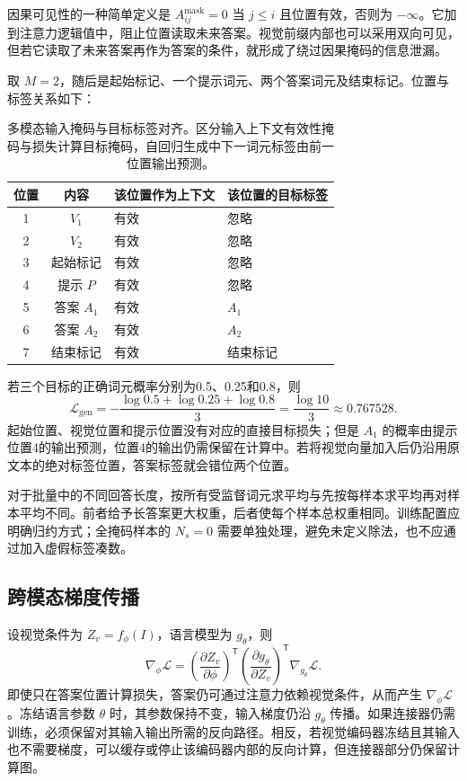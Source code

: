 \documentclass[../textbook.tex]{subfiles}
\begin{document}
因果可见性的一种简单定义是 $A_{ij}^{\mathrm{mask}}=0$ 当 $j\le i$ 且位置有效，否则为 $-\infty$。它加到注意力逻辑值中，阻止位置读取未来答案。视觉前缀内部也可以采用双向可见，但若它读取了未来答案再作为答案的条件，就形成了绕过因果掩码的信息泄漏。

\begin{example}

取 $M=2$，随后是起始标记、一个提示词元、两个答案词元及结束标记。位置与标签关系如下：
\begin{table}[htbp]
\centering
\caption[多模态输入掩码与目标标签对齐]{多模态输入掩码与目标标签对齐。区分输入上下文有效性掩码与损失计算目标掩码，自回归生成中下一词元标签由前一位置输出预测。}\label{tab:mm-labels}
\begin{tabular}{ccll}
\toprule 位置 & 内容 & 该位置作为上下文 & 该位置的目标标签\\\midrule
1 & $V_1$ & 有效 & 忽略\\
2 & $V_2$ & 有效 & 忽略\\
3 & 起始标记 & 有效 & 忽略\\
4 & 提示 $P$ & 有效 & 忽略\\
5 & 答案 $A_1$ & 有效 & $A_1$\\
6 & 答案 $A_2$ & 有效 & $A_2$\\
7 & 结束标记 & 有效 & 结束标记\\\bottomrule
\end{tabular}
\end{table}
若三个目标的正确词元概率分别为0.5、0.25和0.8，则
\begin{equation*}
 \mathcal L_{\mathrm{gen}}
 =-\frac{\log0.5+\log0.25+\log0.8}{3}
 =\frac{\log10}{3}\approx0.767528.
\end{equation*}
起始位置、视觉位置和提示位置没有对应的直接目标损失；但是 $A_1$ 的概率由提示位置4的输出预测，位置4的输出仍需保留在计算中。若将视觉向量加入后仍沿用原文本的绝对标签位置，答案标签就会错位两个位置。

对于批量中的不同回答长度，按所有受监督词元求平均与先按每样本求平均再对样本平均不同。前者给予长答案更大权重，后者使每个样本总权重相同。训练配置应明确归约方式；全掩码样本的 $N_s=0$ 需要单独处理，避免未定义除法，也不应通过加入虚假标签凑数。
\end{example}

\subsection{跨模态梯度传播}
设视觉条件为 $Z_v=f_\phi(I)$，语言模型为 $g_\theta$，则
\begin{equation}
 \nabla_\phi\mathcal L
 =\left(\frac{\partial Z_v}{\partial\phi}\right)^{\mathsf T}
 \left(\frac{\partial g_\theta}{\partial Z_v}\right)^{\mathsf T}
 \nabla_{g_\theta}\mathcal L.
\end{equation}
即使只在答案位置计算损失，答案仍可通过注意力依赖视觉条件，从而产生 $\nabla_\phi\mathcal L$。冻结语言参数 $\theta$ 时，其参数保持不变，输入梯度仍沿 $g_\theta$ 传播。如果连接器仍需训练，必须保留对其输入输出所需的反向路径。相反，若视觉编码器冻结且其输入也不需要梯度，可以缓存或停止该编码器内部的反向计算，但连接器部分仍保留计算图。
\end{document}
